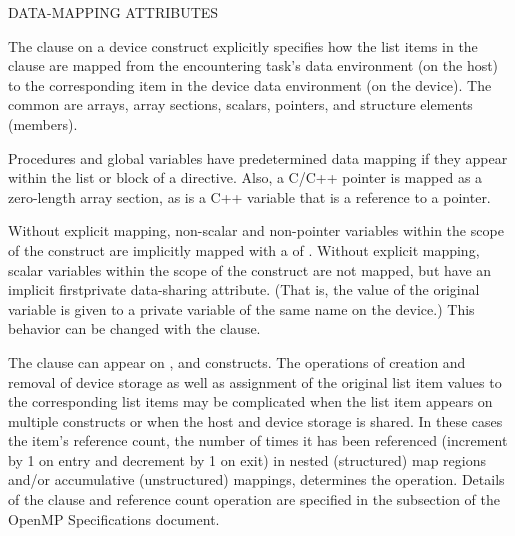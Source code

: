 \bigskip
DATA-MAPPING ATTRIBUTES

The  clause on a device construct explicitly specifies how the list items in
the clause are mapped from the encountering task's data environment (on the host)
to the corresponding item in the device data environment (on the device).
The common  are arrays, array sections, scalars, pointers, and
structure elements (members). 

Procedures and global variables have predetermined data mapping if they appear
within the list or block of a  directive. Also, a C/C++ pointer
is mapped as a zero-length array section, as is a C++ variable that is a reference to a pointer.

Without explicit mapping, non-scalar and non-pointer variables within the scope of the 
construct are implicitly mapped with a  of .
Without explicit mapping, scalar variables within the scope of the 
construct are not mapped, but have an implicit firstprivate data-sharing
attribute. (That is, the value of the original variable is given to a private
variable of the same name on the device.) This behavior can be changed with
the  clause.

The  clause can appear on ,  and 
 constructs.  The operations of creation and
removal of device storage as well as assignment of the original list item 
values to the corresponding list items may be complicated when the list 
item appears on multiple constructs or when the host and device storage 
is shared. In these cases the item's reference count, the number of times
it has been referenced (increment by 1 on entry and decrement by 1 on exit) in nested (structured)
map regions and/or accumulative (unstructured) mappings, determines the operation.
Details of the  clause and reference count operation are specified 
in the  subsection of the OpenMP Specifications document.



















